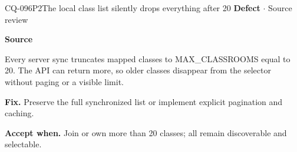 \begin{finding}{CQ-096}{P2}{The local class list silently drops everything after 20}
\textbf{Defect} $\cdot$ Source review\par
\textbf{Source}\quad{}\par
Every server sync truncates mapped classes to MAX\_CLASSROOMS equal to 20. The API can return more, so older classes disappear from the selector without paging or a visible limit.\par
\textbf{Fix.} Preserve the full synchronized list or implement explicit pagination and caching.\par
\textbf{Accept when.} Join or own more than 20 classes; all remain discoverable and selectable.
\end{finding}
\clearpage
